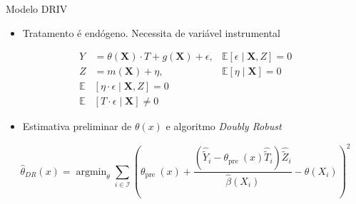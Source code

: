\documentclass[
  12pt,
  ignorenonframetext,
  aspectratio=169]{beamer}
\providecommand{\tightlist}{%
  \setlength{\itemsep}{0pt}\setlength{\parskip}{0pt}}
\newcommand{\bfx}{\mathbf{X}}
\DeclareMathOperator*{\argmin}{argmin}
\begin{document}
\begin{frame}{Modelo DRIV}
\protect\hypertarget{modelo-driv}{}
\begin{itemize}
\tightlist
\item
  Tratamento é endógeno. Necessita de variável instrumental
\end{itemize}

\vspace{-1em}

\begin{align*}
    Y&=\theta(\bfx)\cdot T+g(\bfx)+\epsilon, &\mathbb{E}[\epsilon\mid \bfx, Z]=0\\
    Z&=m(\bfx)+\eta, &\mathbb{E}[\eta\mid\bfx]=0\\
    \mathbb{E}&[\eta\cdot\epsilon\mid \bfx, Z]=0\\
    \mathbb{E}&[T\cdot\epsilon\mid\bfx]\neq 0
\end{align*}

\begin{itemize}
\tightlist
\item
  Estimativa preliminar de \(\theta(x)\) e algoritmo \emph{Doubly
  Robust}
\end{itemize}

\vspace{-1em}

\begin{equation*}
\hat{\theta}_{DR}(x)=\argmin_{\theta}\sum_{i\in\mathcal{I}}\left(\theta_{\text {pre }}(x)+\frac{\left(\hat{\tilde{Y}}_i-\theta_{\text {pre }}(x) \hat{\tilde{T}}_i\right) \hat{\tilde{Z}}_i}{\hat\beta(X_i)}-\theta(X_i)\right)^{2}
\end{equation*}
\end{frame}
\end{document}

